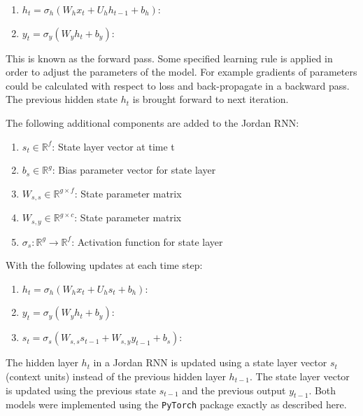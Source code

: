 \documentclass[conference]{IEEEtran}
\begin{document}
\begin{enumerate}
	\item $h_t = \sigma_h(W_h x_t + U_h h_{t-1} + b_h)$: 
	\item $y_t = \sigma_y(W_y h_t + b_y)$: 
\end{enumerate}

This is known as the forward pass. Some specified learning rule is applied in order to adjust the parameters of the model. For example gradients of parameters could be calculated with respect to loss and back-propagate in a backward pass. The previous hidden state $h_t$ is brought forward to next iteration.

The following additional components are added to the Jordan RNN:

\begin{enumerate}
	\item $s_t \in \mathbb{R}^f$: State layer vector at time t
	
	\item $b_s \in \mathbb{R}^{g}$: Bias parameter vector for state layer
	
	\item $W_{s,s} \in \mathbb{R}^{g \times f}$: State parameter matrix
	\item $W_{s,y} \in \mathbb{R}^{g \times c}$: State parameter matrix
	
	\item $\sigma_s: \mathbb{R}^g \to \mathbb{R}^f$: Activation function for state layer
	
	
	
\end{enumerate}

With the following updates at each time step:

\begin{enumerate}
	\item $h_t = \sigma_h(W_h x_t + U_h s_t + b_h)$: 
	\item $y_t = \sigma_y(W_y h_t + b_y)$: 
	\item $s_t = \sigma_s(W_{s,s} s_{t-1} + W_{s,y} y_{t-1} + b_s)$: 
\end{enumerate}

The hidden layer $h_t$ in a Jordan RNN is updated using a state layer vector $s_t$ (context units) instead of the previous hidden layer $h_{t-1}$. The state layer vector is updated using the previous state $s_{t-1}$ and the previous output $y_{t-1}$. Both models were implemented using the \texttt{PyTorch} package exactly as described here.
\end{document}
